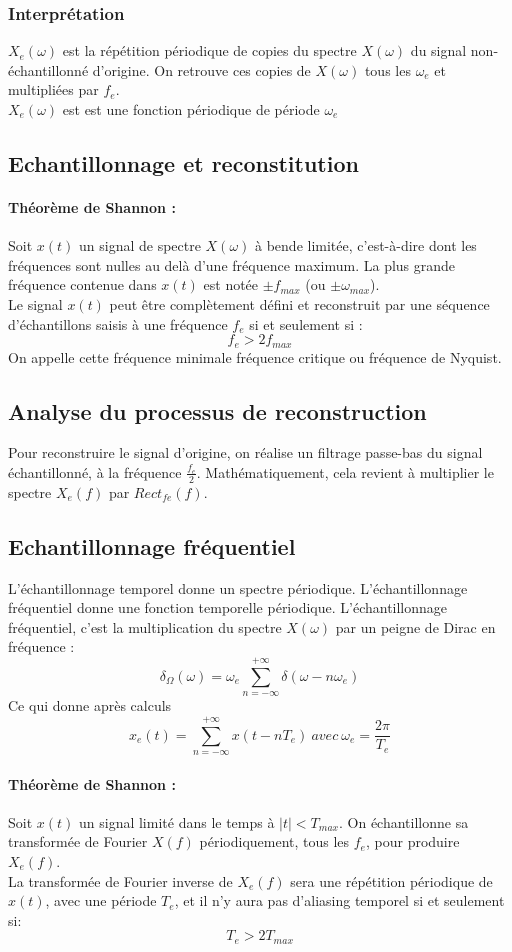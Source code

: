 \documentclass[10pt,a4paper,twoside]{article}
\begin{document}
\subsubsection{Interprétation}
$X_{e}(\omega)$ est la répétition périodique de copies du spectre $X(\omega)$ du signal non-échantillonné d'origine. On retrouve ces copies de $X(\omega)$ tous les $\omega_{e}$ et multipliées par $f_{e}$.\\
$X_{e}(\omega)$ est est une fonction périodique de période $\omega_{e}$

\subsection{Echantillonnage et reconstitution}
\paragraph{Théorème de Shannon :} Soit $x(t)$ un signal de spectre $X(\omega)$ à bende limitée, c'est-à-dire dont les fréquences sont nulles au delà d'une fréquence maximum. La plus grande fréquence contenue dans $x(t)$ est notée $\pm f_{max}$ (ou $\pm\omega_{max}$).\\
Le signal $x(t)$ peut être complètement défini et reconstruit par une séquence d'échantillons saisis à une fréquence $f_{e}$ si et seulement si :
$$f_{e} > 2f_{max}$$
On appelle cette fréquence minimale fréquence critique ou fréquence de Nyquist.

\subsection{Analyse du processus de reconstruction}
Pour reconstruire le signal d'origine, on réalise un filtrage passe-bas du signal échantillonné, à la fréquence $\frac{f_{e}}{2}$. Mathématiquement, cela revient à multiplier le spectre $X_{e}(f)$ par $Rect_{fe}(f)$.


\subsection{Echantillonnage fréquentiel}
L'échantillonnage temporel donne un spectre périodique. L'échantillonnage fréquentiel donne une fonction temporelle périodique. L'échantillonnage fréquentiel, c'est la multiplication du spectre $X(\omega)$ par un peigne de Dirac en fréquence :
$$\delta_{\Omega}(\omega) = \omega_{e}\sum_{n=-\infty}^{+\infty}\delta(\omega-n\omega_{e})$$
Ce qui donne après calculs
$$x_{e}(t)=\sum_{n=-\infty}^{+\infty}x(t-nT_{e})\ avec\ \omega_{e}=\frac{2\pi}{T_{e}}$$

\paragraph{Théorème de Shannon :} Soit $x(t)$ un signal limité dans le temps à $|t|<T_{max}$. On échantillonne sa transformée de Fourier $X(f)$ périodiquement, tous les $f_{e}$, pour produire $X_{e}(f)$.\\
La transformée de Fourier inverse de $X_{e}(f)$ sera une répétition périodique de $x(t)$, avec une période $T_{e}$, et il n'y aura pas d'aliasing temporel si et seulement si:
$$T_{e} > 2T_{max}$$
\end{document}
